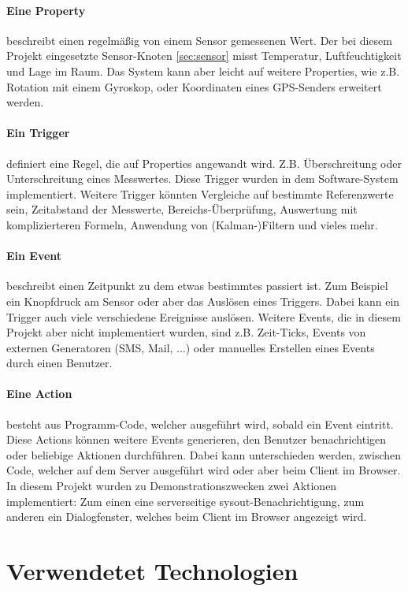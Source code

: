 \documentclass[12pt,a4paper,twoside]{article}
\newcommand{\labelSec}[1]{\label{sec:#1}}
\begin{document}
\paragraph{Eine Property} beschreibt einen regelmäßig von einem Sensor gemessenen Wert. Der bei diesem Projekt eingesetzte Sensor-Knoten \ref{sec:sensor} misst Temperatur, Luftfeuchtigkeit und Lage im Raum. Das System kann aber leicht auf weitere Properties, wie z.B. Rotation mit einem Gyroskop, oder Koordinaten eines GPS-Senders erweitert werden. 
\paragraph{Ein Trigger} definiert eine Regel, die auf Properties angewandt wird. Z.B. Überschreitung oder Unterschreitung eines Messwertes. Diese Trigger wurden in dem Software-System implementiert. Weitere Trigger könnten Vergleiche auf bestimmte Referenzwerte sein, Zeitabstand der Messwerte, Bereichs-Überprüfung, Auswertung mit komplizierteren Formeln, Anwendung von (Kalman-)Filtern  und vieles mehr. 
\paragraph{Ein Event} beschreibt einen Zeitpunkt zu dem etwas bestimmtes passiert ist. Zum Beispiel ein Knopfdruck am Sensor oder aber das Auslösen eines Triggers. Dabei kann ein Trigger auch viele verschiedene Ereignisse auslösen. Weitere Events, die in diesem Projekt aber nicht implementiert wurden, sind z.B. Zeit-Ticks, Events von externen Generatoren (SMS, Mail, ...) oder manuelles Erstellen eines Events durch einen Benutzer.

\paragraph{Eine Action} besteht aus Programm-Code, welcher ausgeführt wird, sobald ein Event eintritt. Diese Actions können weitere Events generieren, den Benutzer benachrichtigen oder beliebige Aktionen durchführen. Dabei kann unterschieden werden, zwischen Code, welcher auf dem Server ausgeführt wird oder aber beim Client im Browser. In diesem Projekt wurden zu Demonstrationszwecken zwei Aktionen implementiert: Zum einen eine serverseitige sysout-Benachrichtigung, zum anderen ein Dialogfenster, welches beim Client im Browser angezeigt wird. 

\section{Verwendetet Technologien} \labelSec{abschnitt}
\end{document}
